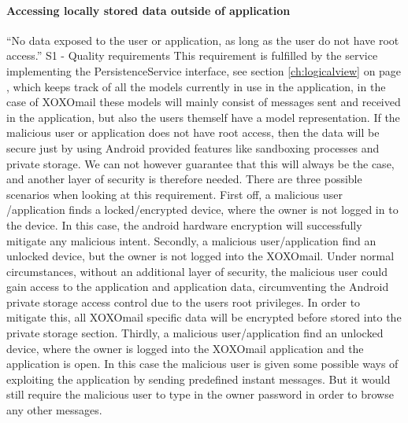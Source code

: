\paragraph{Accessing locally stored data outside of application}\hfill
\newline
“No data exposed to the user or application, as long as the user do not have root access.” S1 - Quality requirements
\newline
\newline
This requirement is fulfilled by the service implementing the PersistenceService interface, see section \ref{ch:logicalview} on page \pageref{ch:logicalview}, which keeps track of all the models currently in use in the application, in the case of XOXOmail these models will mainly consist of messages sent and received in the application, but also the users themself have a model representation. If the malicious user or application does not have root access, then the data will be secure just by using Android provided features like sandboxing processes and private storage. We can not however guarantee that this will always be the case, and another layer of security is therefore needed. 
\newline
\newline
There are three possible scenarios when looking at this requirement. First off, a malicious user /application finds a locked/encrypted device, where the owner is not logged in to the device. In this case, the android hardware encryption will successfully mitigate any malicious intent.
Secondly, a malicious user/application find an unlocked device, but the owner is not logged into the XOXOmail. Under normal circumstances, without an additional layer of security, the malicious user could gain access to the application and application data, circumventing the Android private storage access control due to the users root privileges. In order to mitigate this, all XOXOmail specific data will be encrypted before stored into the private storage section. 
Thirdly, a malicious user/application find an unlocked device, where the owner is logged into the XOXOmail application and the application is open. In this case the malicious user is given some possible ways of exploiting the application by sending predefined instant messages. But it would still require the malicious user to type in the owner password in order to browse any other messages. 

